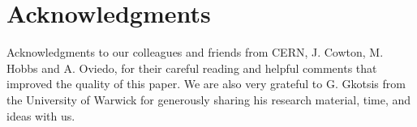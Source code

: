 \section{Acknowledgments}
\label{acknowledgments}

Acknowledgments to our colleagues and friends from CERN, J. Cowton, M. Hobbs and A. Oviedo, for their careful reading and helpful comments that improved the quality of this paper. We are also very grateful to G. Gkotsis from the University of Warwick for generously sharing his research material, time, and ideas with us.
